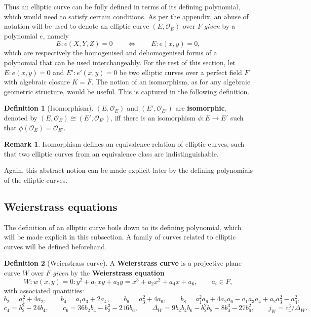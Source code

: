 \documentclass{article}
\newcommand{\rb}[1]{\left( #1 \right)}
\theoremstyle{definition}\newtheorem*{definition}{Definition}
\theoremstyle{definition}\newtheorem*{example}{Example}
\theoremstyle{definition}\newtheorem*{remark}{Remark}
\begin{document}
Thus an elliptic curve can be fully defined in terms of its defining polynomial, which would need to satisfy certain conditions. As per the appendix, an abuse of notation will be used to denote an elliptic curve $ \rb{E, \mathcal{O}_E} $ over $ F $ \emph{given} by a polynomial $ e $, namely
$$ E : e\rb{X, Y, Z} = 0 \qquad \iff \qquad E : e\rb{x, y} = 0, $$
which are respectively the homogenised and dehomogenised forms of a polynomial that can be used interchangeably. For the rest of this section, let $ E : e\rb{x, y} = 0 $ and $ E' : e'\rb{x, y} = 0 $ be two elliptic curves over a perfect field $ F $ with algebraic closure $ K = \overline{F} $. The notion of an isomorphism, as for any algebraic geometric structure, would be useful. This is captured in the following definition.

\begin{definition}[Isomorphism]
$ \rb{E, \mathcal{O}_E} $ and $ \rb{E', \mathcal{O}_{E'}} $ are \textbf{isomorphic}, denoted by $ \rb{E, \mathcal{O}_E} \cong \rb{E', \mathcal{O}_{E'}} $, iff there is an isomorphism $ \phi : E \to E' $ such that $ \phi\rb{\mathcal{O}_E} = \mathcal{O}_{E'} $.
\end{definition}

\begin{remark}
Isomorphism defines an equivalence relation of elliptic curves, such that two elliptic curves from an equivalence class are indistinguishable.
\end{remark}

Again, this abstract notion can be made explicit later by the defining polynomials of the elliptic curves.

\pagebreak

\subsection{Weierstrass equations}

The definition of an elliptic curve boils down to its defining polynomial, which will be made explicit in this subsection. A family of curves related to elliptic curves will be defined beforehand.

\begin{definition}[Weierstrass curve]
A \textbf{Weierstrass curve} is a projective plane curve $ W $ over $ F $ \emph{given} by the \textbf{Weierstrass equation}
$$ W : w\rb{x, y} = 0 : y^2 + a_1xy + a_3y = x^3 + a_2x^2 + a_4x + a_6, \qquad a_i \in F, $$
with associated quantities:
$$ b_2 = a_1^2 + 4a_2, \qquad b_4 = a_1a_3 + 2a_4, \qquad b_6 = a_3^2 + 4a_6, \qquad b_8 = a_1^2a_6 + 4a_2a_6 - a_1a_3a_4 + a_2a_3^2 - a_4^2, $$
$$ c_4 = b_2^2 - 24b_4 , \qquad c_6 = 36b_2b_4 - b_2^3 - 216b_6, \qquad \Delta_W = 9b_2b_4b_6 - b_2^2b_8 - 8b_4^3 - 27b_6^2, \qquad j_W = c_4^3 / \Delta_W. $$
\end{definition}
\end{document}
